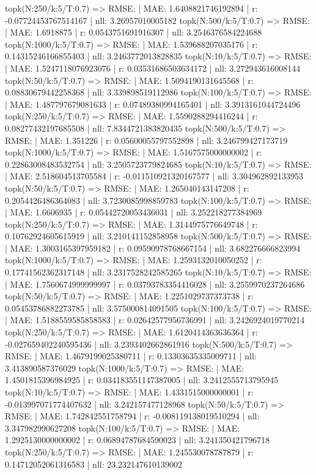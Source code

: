 topk(N:250/k:5/T:0.7) => RMSE: | MAE: 1.6408821746192894 | r: -0.07724453767514167 | nll: 3.26957010005182
topk(N:500/k:5/T:0.7) => RMSE: | MAE: 1.6918875 | r: 0.0543751691916307 | nll: 3.2546376584224688
topk(N:1000/k:5/T:0.7) => RMSE: | MAE: 1.539688207035176 | r: 0.14315246166855403 | nll: 3.2463772013828835
topk(N:10/k:5/T:0.7) => RMSE: | MAE: 1.5247118076923076 | r: 0.03531686503634172 | nll: 3.272943616008144
topk(N:50/k:5/T:0.7) => RMSE: | MAE: 1.5094190131645568 | r: 0.08830679442258368 | nll: 3.339898519112986
topk(N:100/k:5/T:0.7) => RMSE: | MAE: 1.487797679081633 | r: 0.07489380994165401 | nll: 3.3913161044724496
topk(N:250/k:5/T:0.7) => RMSE: | MAE: 1.5590288294416244 | r: 0.08277432197685508 | nll: 7.8344721383820435
topk(N:500/k:5/T:0.7) => RMSE: | MAE: 1.351226 | r: 0.05600055797552898 | nll: 3.246799427173719
topk(N:1000/k:5/T:0.7) => RMSE: | MAE: 1.5167575000000002 | r: 0.22863008483532754 | nll: 3.2505723779824685
topk(N:10/k:5/T:0.7) => RMSE: | MAE: 2.518604513705584 | r: -0.011510921320167577 | nll: 3.304962892133953
topk(N:50/k:5/T:0.7) => RMSE: | MAE: 1.265040143147208 | r: 0.2054426486364083 | nll: 3.7230085998859783
topk(N:100/k:5/T:0.7) => RMSE: | MAE: 1.6606935 | r: 0.05442720053436031 | nll: 3.252218277384969
topk(N:250/k:5/T:0.7) => RMSE: | MAE: 1.3144975776649748 | r: 0.10762924605615919 | nll: 3.210141152858958
topk(N:500/k:5/T:0.7) => RMSE: | MAE: 1.3003165397959182 | r: 0.09590978768667154 | nll: 3.682276666823994
topk(N:1000/k:5/T:0.7) => RMSE: | MAE: 1.2593132010050252 | r: 0.17741562362317148 | nll: 3.2317528242585265
topk(N:10/k:5/T:0.7) => RMSE: | MAE: 1.7560674999999997 | r: 0.03793783354416028 | nll: 3.2559970237264686
topk(N:50/k:5/T:0.7) => RMSE: | MAE: 1.2251029737373738 | r: 0.05453786882273785 | nll: 3.575000814091505
topk(N:100/k:5/T:0.7) => RMSE: | MAE: 1.5188559585858583 | r: 0.02642577956736991 | nll: 3.2426924019770214
topk(N:250/k:5/T:0.7) => RMSE: | MAE: 1.6120414363636364 | r: -0.027659402240595436 | nll: 3.2393402662861916
topk(N:500/k:5/T:0.7) => RMSE: | MAE: 1.4679199025380711 | r: 0.13303635335009711 | nll: 3.413890587376029
topk(N:1000/k:5/T:0.7) => RMSE: | MAE: 1.4501815396984925 | r: 0.034183551147387005 | nll: 3.2412555713795945
topk(N:10/k:5/T:0.7) => RMSE: | MAE: 1.4331515000000001 | r: -0.013997071774407632 | nll: 3.242157477128968
topk(N:50/k:5/T:0.7) => RMSE: | MAE: 1.742842551758794 | r: -0.008119138019510294 | nll: 3.347982990627208
topk(N:100/k:5/T:0.7) => RMSE: | MAE: 1.2925130000000002 | r: 0.06894787684590023 | nll: 3.241350421796718
topk(N:250/k:5/T:0.7) => RMSE: | MAE: 1.245530078787879 | r: 0.14712052061316583 | nll: 23.232147610139002
